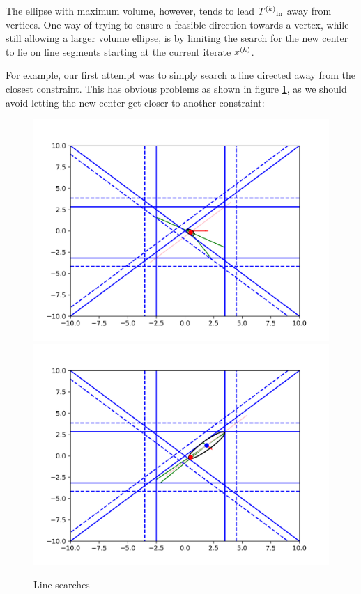 The ellipse with maximum volume, however, tends to lead ${T^{(k)}}_{\text{in}}$ away from vertices.
One way of trying to ensure a feasible direction towards a vertex, while still allowing a larger volume ellipse, is by limiting the search for the new center to lie on line segments starting at the current iterate ${x}^{(k)}$.

For example, our first attempt was to simply search a line directed away from the closest constraint.
This has obvious problems as shown in figure \ref{first_line_search}, as we should avoid letting the new center get closer to another constraint:

\begin{figure}[h]
    \centering
    \includegraphics[scale=0.4]{images/line_1.png}
    \includegraphics[scale=0.4]{images/line_2.png}
    \caption{Line searches}
    \label{first_line_search}
\end{figure}


